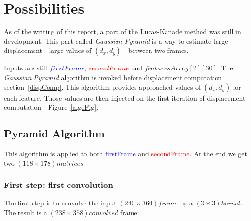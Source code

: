 \section{Possibilities}

As of the writing of this report, a part of the Lucas-Kanade method was still in development. This part called \emph{Gaussian Pyramid} is a way to estimate large displacement - large values of $(d_{x},d_{y})$ - between two frames.

Inputs are still \textcolor{blue}{$firstFrame$}, \textcolor{red}{$secondFrame$} and  $featuresArray[2][30]$. The \emph{Gaussian Pyramid} algorithm is invoked before displacement computation section~\ref{dispComp}. This algorithm provides approached values of $(d_{x},d_{y})$ for each feature. Those values are then injected on the first iteration of displacement computation - Figure~\ref{algoFig}.

\subsection{Pyramid Algorithm}

This algorithm is applied to both \textcolor{blue}{firstFrame} and \textcolor{red}{secondFrame}. At the end we get two $(118\times 178) matrices$.


\subsubsection{First step: first convolution}

The first step is to convolve the input $(240\times 360) frame$ by a $(3\times 3) kernel$. The result is a $(238\times 358) convolved$ frame:

\vspace{5mm}

